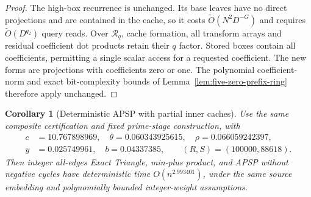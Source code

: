 \documentclass[11pt]{article}
\newtheorem{corollary}[theorem]{Corollary}
\newcommand{\softO}{\widetilde O}
\begin{document}
\begin{proof}
The high-box recurrence is unchanged. Its base leaves have no direct
projections and are contained in the cache, so it costs
$\softO(N^2D^{-G})$ and requires $\softO(D^{q_2})$ query reads.
Over $\mathcal R_q$, cache formation, all transform arrays and residual
coefficient dot products retain their $q$ factor. Stored boxes contain
all coefficients, permitting a single scalar access for a requested
coefficient. The new forms are projections with coefficients zero or
one. The polynomial coefficient-norm and exact bit-complexity bounds
of Lemma~\ref{lem:five-zero-prefix-ring} therefore apply unchanged.
\end{proof}

\begin{corollary}[Deterministic APSP with partial inner caches]
\label{cor:five-cache-apsp}
Use the same composite certification and fixed prime-stage construction,
with
\[
 \begin{split}
 c&=10.767898969,\quad \theta=0.060343925615,\quad
 \rho=0.066059242397,\\
 y&=0.025749961,\quad b=0.04337385,\qquad (R,S)=(100000,88618).
 \end{split}
\]
Then integer all-edges Exact Triangle, min-plus product, and APSP without
negative cycles have deterministic time $O(n^{2.993401})$, under the
same source embedding and polynomially bounded integer-weight assumptions.
\end{corollary}
\end{document}
